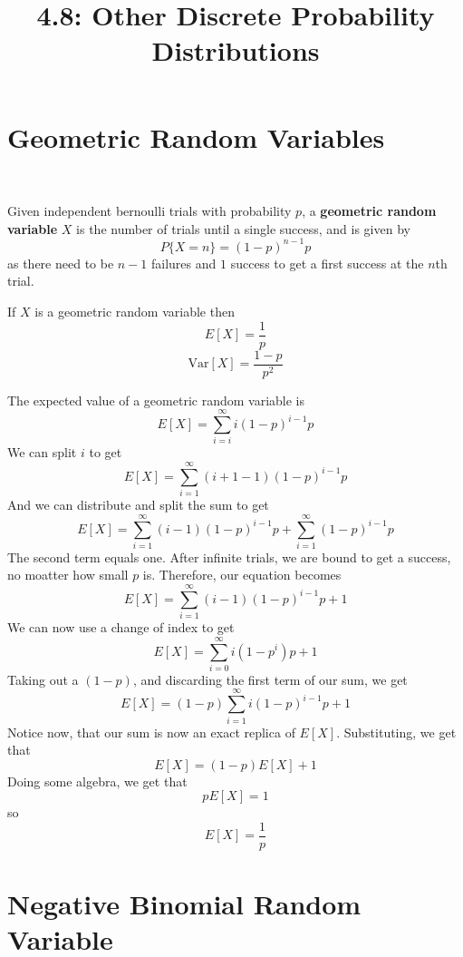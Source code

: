 \documentclass{article}
\title{4.8: Other Discrete Probability Distributions}
\begin{document}
\maketitle

\section{Geometric Random Variables}
\ 
\begin{definition}
Given independent bernoulli trials with probability $p$, a \textbf{geometric random variable} $X$ is the number of trials until a single success, and is given by $$P\{X = n\} = (1-p)^{n-1}p$$as there need to be $n-1$ failures and $1$ success to get a first success at the $n$th trial. 
\end{definition}

\begin{proposition}

If $X$ is a geometric random variable then $$E[X] = \frac{1}{p}$$ $$\text{Var}[X] = \frac{1-p}{p^2}$$

\end{proposition}

\begin{customproof}


The expected value of a geometric random variable is $$E[X] = \sum_{i=i}^{\infty} i(1-p)^{i-1}p$$We can split $i$ to get $$E[X] = \sum_{i=1}^{\infty}(i+1-1)(1-p)^{i-1}p$$And we can distribute and split the sum to get $$E[X]=\sum_{i=1}^{\infty}(i-1)(1-p)^{i-1}p + \sum_{i=1}^{\infty}(1-p)^{i-1}p$$The second term equals one. After infinite trials, we are bound to get a success, no moatter how small $p$ is. Therefore, our equation becomes $$E[X] = \sum_{i=1}^{\infty}(i-1)(1-p)^{i-1}p +1$$We can now use a change of index to get $$E[X] = \sum_{i=0}^\infty i(1-p^i)p + 1$$Taking out a $(1-p)$, and discarding the first term of our sum, we get $$E[X] = (1-p)\sum_{i=1}^\infty i(1-p)^{i-1}p + 1$$Notice now, that our sum is now an exact replica of $E[X]$. Substituting, we get that $$E[X] = (1-p)E[X] + 1$$Doing some algebra, we get that $$pE[X] = 1$$ so $$E[X] = \frac{1}{p}$$

\end{customproof}

\section{Negative Binomial Random Variable}
\end{document}
